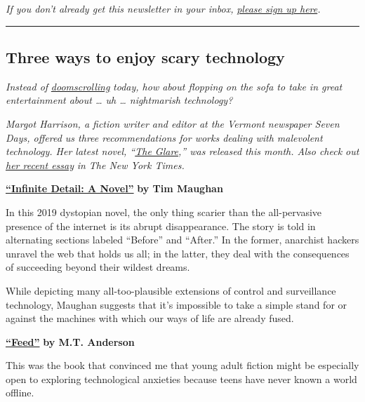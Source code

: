 \emph{If you don't already get this newsletter in your inbox,}
\href{https://www.nytimes3xbfgragh.onion/newsletters/signup/OT}{\emph{please
sign up here}}\emph{.}

\begin{center}\rule{0.5\linewidth}{\linethickness}\end{center}

\hypertarget{three-ways-to-enjoy-scary-technology}{%
\subsection{Three ways to enjoy scary
technology}\label{three-ways-to-enjoy-scary-technology}}

\emph{Instead of}
\href{https://www.nytimes3xbfgragh.onion/2020/07/16/technology/coronavirus-doomscrolling.html}{\emph{doomscrolling}}
\emph{today, how about flopping on the sofa to take in great
entertainment about \ldots{} uh \ldots{} nightmarish technology?}

\emph{Margot Harrison, a fiction writer and editor at the Vermont
newspaper Seven Days, offered us three recommendations for works dealing
with malevolent technology. Her latest novel,
``}\href{https://www.lbyr.com/titles/margot-harrison/the-glare/9781368005654/}{\emph{The
Glare}}\emph{,'' was released this month. Also check out}
\href{https://www.nytimes3xbfgragh.onion/2020/07/18/books/review/cyber-horror-virtual-life-uncanny-valley.html}{\emph{her
recent essay}} \emph{in The New York Times.}

\textbf{\href{https://us.macmillan.com/books/9780374175412}{``Infinite
Detail: A Novel''}} \textbf{by Tim Maughan}

In this 2019 dystopian novel, the only thing scarier than the
all-pervasive presence of the internet is its abrupt disappearance. The
story is told in alternating sections labeled ``Before'' and ``After.''
In the former, anarchist hackers unravel the web that holds us all; in
the latter, they deal with the consequences of succeeding beyond their
wildest dreams.

While depicting many all-too-plausible extensions of control and
surveillance technology, Maughan suggests that it's impossible to take a
simple stand for or against the machines with which our ways of life are
already fused.

\textbf{\href{https://www.candlewick.com/cat.asp?mode=book\&isbn=0763662623}{``Feed''}}
\textbf{by M.T. Anderson}

This was the book that convinced me that young adult fiction might be
especially open to exploring technological anxieties because teens have
never known a world offline.

